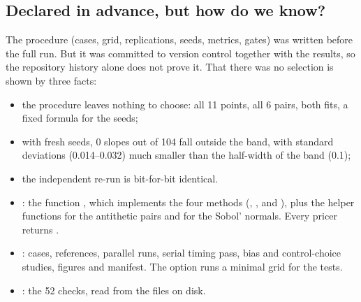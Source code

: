 \subsection{Declared in advance, but how do we know?}
The procedure (cases, grid, replications, seeds, metrics, gates) was written before the full run. But it was committed
to version control together with the results, so the repository history alone does not prove it. That there was no
selection is shown by three facts:
\begin{itemize}
\item the procedure leaves nothing to choose: all 11 points, all 6 pairs, both fits, a fixed formula for the seeds;
\item with fresh seeds, 0 slopes out of 104 fall outside the band, with standard deviations (0.014--0.032) much
smaller than the half-width of the band (0.1);
\item the independent re-run is bit-for-bit identical.
\end{itemize}

\begin{progetto}[title={In the qpricer project: the benchmark files}]
\begin{itemize}
\item {}: the function , which implements the four methods
(, ,  and ), plus the helper functions for the antithetic pairs and
for the Sobol' normals. Every pricer returns .
\item {}: cases, references, parallel runs, serial timing pass, bias and control-choice
studies, figures and manifest. The  option runs a minimal grid for the tests.
\item {}: the 52 checks, read from the files on disk.
\end{itemize}
\end{progetto}


